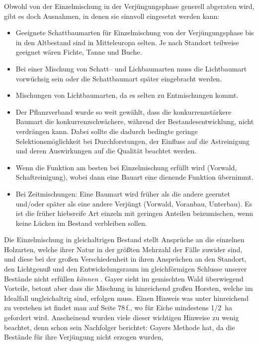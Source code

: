 \documentclass[twocolumn]{scrartcl}
\begin{document}
Obwohl von der Einzelmischung in der Verjüngungsphase generell
abgeraten wird, gibt es doch Ausnahmen, in denen sie sinnvoll
eingesetzt werden kann:
\begin{itemize}
\item Geeignete Schattbaumarten für Einzelmischung von der
  Verjüngungsphase bis in den Altbestand sind in Mitteleuropa
  selten. Je nach Standort teilweise geeignet wären Fichte, Tanne und
  Buche.
\item Bei einer Mischung von Schatt-- und Lichbaumarten muss die
  Lichtbaumart vorwüchsig sein oder die Schattbaumart später
  eingebracht werden.
\item Mischungen von Lichtbaumarten, da es selten zu Entmischungen
  kommt.
\item Der Pflanzverband wurde so weit gewählt, dass die
  konkurrenzstärkere Baumart die konkurrenzschwächere, während der
  Bestandesentwicklung, nicht verdrängen kann. Dabei sollte die
  dadurch bedingte geringe Selektionsmöglichkeit bei Durchforstungen,
  der Einfluss auf die Astreinigung und deren Auswirkungen auf die
  Qualität beachtet werden.
\item Wenn die Funktion am besten bei Einzelmischung erfüllt wird
  (Vorwald, Schaftreinigung), wobei dann eine Bauart eine dienende
  Funktion übernimmt.
\item Bei Zeitmischungen: Eine Baumart wird früher als die andere
  geerntet und/oder später als eine andere Verjüngt (Vorwald,
  Voranbau, Unterbau). Es ist die früher hiebsreife Art einzeln mit
  geringen Anteilen beizumischen, wenn keine Lücken im Bestand
  verbleiben sollen.
\end{itemize}
\frqq Die Einzelmischung in gleichaltrigen Bestand stellt Ansprüche an
die einzelnen Holzarten, welche ihrer Natur in der größten Mehrzahl
der Fälle zuwider sind, und diese bei der großen Verschiedenheit in
ihren Ansprüchen an den Standort, den Lichtgenuß und den
Entwickelungsraum im gleichförmigen Schlusse unserer Bestände nicht
erfüllen \emph{können}\flqq{}
\citep[S.~147]{gayer1886DerGemischteWald}. Gayer sieht im gemischten
Wald überwiegend Vorteile, betont aber dass die Mischung in
hinreichend großen Horsten, welche im Idealfall ungleichaltrig sind,
erfolgen muss. Einen Hinweis was unter hinreichend zu verstehen ist
findet man auf Seite 78\,f., wo für Eiche mindestens 1/2~ha gefordert
wird. Anscheinend wurden viele dieser wichtigen Hinweise zu wenig
beachtet, denn schon sein Nachfolger berichtet: \frqq Gayers Methode
hat, da die Bestände für ihre Verjüngung nicht erzogen wurden,
\end{document}
